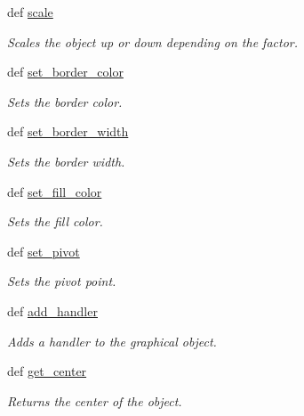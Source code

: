 \begin{DoxyCompactItemize}
def \hyperlink{classcs110graphics_1_1Fillable_a80d5b6b6d2ebae867dccecb803075749}{scale}
\begin{DoxyCompactList}\small\item\em Scales the object up or down depending on the factor. \item\end{DoxyCompactList}\item 
def \hyperlink{classcs110graphics_1_1Fillable_a2f830be5d970faac97759910d20d68a4}{set\_\-border\_\-color}
\begin{DoxyCompactList}\small\item\em Sets the border color. \item\end{DoxyCompactList}\item 
def \hyperlink{classcs110graphics_1_1Fillable_a09f05462cb2ed38fdccb244340f05b2b}{set\_\-border\_\-width}
\begin{DoxyCompactList}\small\item\em Sets the border width. \item\end{DoxyCompactList}\item 
def \hyperlink{classcs110graphics_1_1Fillable_a4f24c7186c8d057e42a0209eb1d56be7}{set\_\-fill\_\-color}
\begin{DoxyCompactList}\small\item\em Sets the fill color. \item\end{DoxyCompactList}\item 
def \hyperlink{classcs110graphics_1_1Fillable_a2a6066d1a11c0854ff5ee85e7d9ceb54}{set\_\-pivot}
\begin{DoxyCompactList}\small\item\em Sets the pivot point. \item\end{DoxyCompactList}\item 
def \hyperlink{classcs110graphics_1_1GraphicalObject_adb1af0d5a6baae3f9a08d21a3227c49f}{add\_\-handler}
\begin{DoxyCompactList}\small\item\em Adds a handler to the graphical object. \item\end{DoxyCompactList}\item 
def \hyperlink{classcs110graphics_1_1GraphicalObject_a062789c4cc9de38af32dcc4ff2058607}{get\_\-center}
\begin{DoxyCompactList}\small\item\em Returns the center of the object. \item\end{DoxyCompactList}\item 

\end{DoxyCompactItemize}
